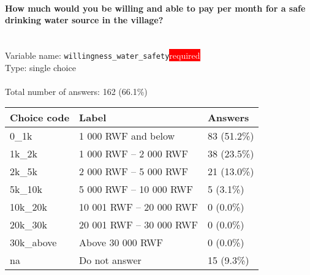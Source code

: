 \documentclass[11.5pt, a4paper]{scrartcl}
\begin{document}
\paragraph{How much would you be willing and able to pay per month for a safe drinking water source in the village?}
\  \\Variable name: \texttt{willingness\_water\_safety}\hfill\colorbox{red}{\small{\textcolor{white}{required}}}\\
 Type: single choice\\
\\Total number of answers: 162 (66.1\%)
\\[0.2em] \begin{tabular}{p{4cm}|p{8cm}|p{3cm}}
Choice code & Label & Answers \\
\hline
0\_1k & 1 000 RWF and below& \cellcolor{color2}83 (51.2\%)\\
\cellcolor{mygray} 1k\_2k & \cellcolor{mygray}1 000 RWF – 2 000 RWF & \cellcolor{color1}38 (23.5\%)\\
2k\_5k & 2 000 RWF – 5 000 RWF& \cellcolor{color0}21 (13.0\%)\\
\cellcolor{mygray} 5k\_10k & \cellcolor{mygray}5 000 RWF – 10 000 RWF & \cellcolor{color0}5 (3.1\%)\\
10k\_20k & 10 001 RWF – 20 000 RWF& \cellcolor{color0}0 (0.0\%)\\
\cellcolor{mygray} 20k\_30k & \cellcolor{mygray}20 001 RWF – 30 000 RWF & \cellcolor{color0}0 (0.0\%)\\
30k\_above & Above 30 000 RWF& \cellcolor{color0}0 (0.0\%)\\
\cellcolor{mygray} na & \cellcolor{mygray}Do not answer & \cellcolor{color0}15 (9.3\%)\\
\end{tabular}
\end{document}

